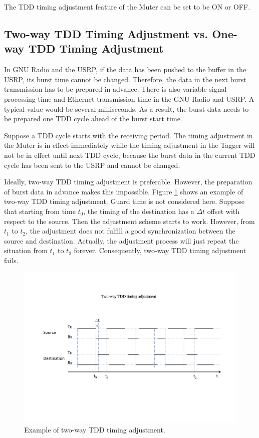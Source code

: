 The TDD timing adjustment feature of the Muter can be set to be ON or OFF.

\subsection{Two-way TDD Timing Adjustment vs. One-way TDD Timing Adjustment}
In GNU Radio and the USRP, if the data has been pushed to the buffer in the USRP, its burst time cannot be changed. Therefore, the data in the next burst transmission has to be prepared in advance. There is also variable signal processing time and Ethernet transmission time in the GNU Radio and USRP. A typical value would be several milliseconds. As a result, the burst data needs to be prepared one TDD cycle ahead of the burst start time.

Suppose a TDD cycle starts with the receiving period. The timing adjustment in the Muter is in effect immediately while the timing adjustment in the Tagger will not be in effect until next TDD cycle, because the burst data in the current TDD cycle has been sent to the USRP and cannot be changed.

Ideally, two-way TDD timing adjustment is preferable. However, the preparation of burst data in advance makes this impossible. Figure \ref{fig:TDDtwoWayAdjustment} shows an example of two-way TDD timing adjustment. Guard time is not considered here. Suppose that starting from time $t_0$, the timing of the destination has a $\Delta t$ offset with respect to the source. Then the adjustment scheme starts to work. However, from $t_1$ to $t_2$, the adjustment does not fulfill a good synchronization between the source and destination. Actually, the adjustment process will just repeat the situation from $t_1$ to $t_2$ forever. Consequently, two-way TDD timing adjustment fails.


\begin{figure}[tpb]
  \begin{center}
    \centerline{\includegraphics[width=160mm]{TDDtwoWayAdjustment.pdf}}
    \caption{Example of two-way TDD timing adjustment.}
    \label{fig:TDDtwoWayAdjustment}
  \end{center}
\end{figure}


